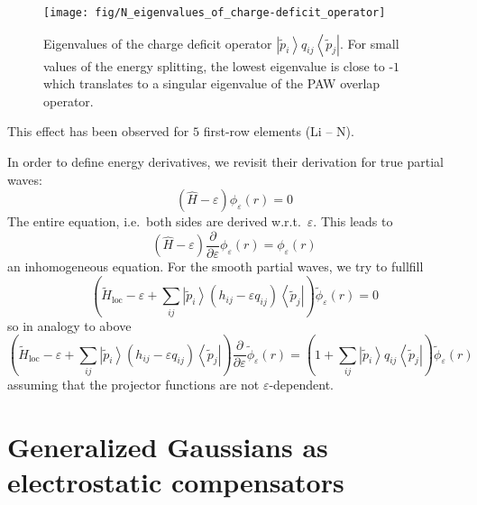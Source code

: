 \documentclass[oribibl]{llncs}
\newcommand{\um}[1]{_{\mathrm{#1}}}
\newcommand{\ket}[1]{\left| #1 \right\rangle}
\newcommand{\bra}[1]{\left\langle #1 \right|}
\begin{document}
\begin{figure} [ht]
  \centering
  \begin{minipage}[c]{.990\textwidth}
	\texttt{[image: fig/N\_eigenvalues\_of\_charge-deficit\_operator]} %
  \end{minipage}\hfill
  \begin{minipage}[c]{.009\textwidth}
  \end{minipage}
  \caption{Eigenvalues of the charge deficit operator $\ket{\tilde{p}_i} q_{ij} \bra{\tilde{p}_j}$.
  For small values of the energy splitting, the lowest eigenvalue is close to -$1$ which translates
  to a singular eigenvalue of the \ac{PAW} overlap operator.
  } \label{fig:eigenvalues_of_charge-deficit_operator}
\end{figure}

This effect has been observed for $5$ first-row elements (Li -- N).

\newpage

In order to define energy derivatives, we revisit their derivation for true partial waves:
\begin{equation}
  \left( \hat H - \varepsilon \right) \phi_\varepsilon(r) = 0
\end{equation}
The entire equation, i.e.~both sides are derived w.r.t.~$\varepsilon$. This leads to
\begin{equation}
  \left( \hat H - \varepsilon \right) \frac{\partial}{\partial \varepsilon} \phi_\varepsilon(r) = \phi_\varepsilon(r)
\end{equation}
an inhomogeneous equation.
For the smooth partial waves, we try to fullfill
\begin{equation}
  \left( \tilde H\um{loc} - \varepsilon + \sum_{ij} \ket{\tilde p_i} (h_{ij} - \varepsilon q_{ij} ) \bra{\tilde p_j} \right) \tilde{\phi}_\varepsilon(r) = 0
\end{equation}
so in analogy to above
\begin{equation}
  \left( \tilde H\um{loc} - \varepsilon + \sum_{ij} \ket{\tilde p_i} (h_{ij} - \varepsilon q_{ij} ) \bra{\tilde p_j} \right) 
  \frac{\partial}{\partial \varepsilon} \tilde{\phi}_\varepsilon(r) = \left( 1 + \sum_{ij} \ket{\tilde p_i} q_{ij} \bra{\tilde p_j} \right) \tilde{\phi}_\varepsilon(r)
\end{equation}
assuming that the projector functions are not $\varepsilon$-dependent.

\newpage

\section*{Generalized Gaussians as electrostatic compensators}
\end{document}
